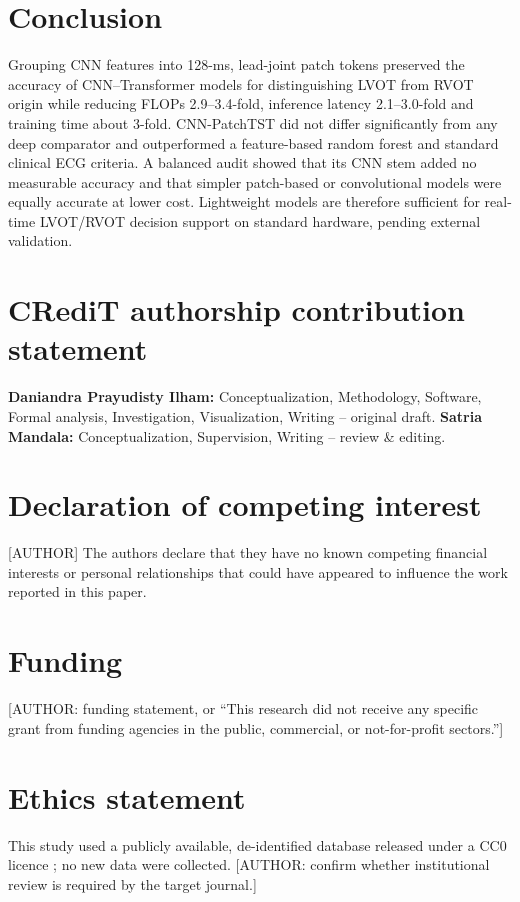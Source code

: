 \documentclass[preprint,12pt]{elsarticle}
\begin{document}
\section{Conclusion}
\label{sec:conclusion}
Grouping CNN features into 128-ms, lead-joint patch tokens preserved the accuracy of CNN--Transformer models for distinguishing LVOT from RVOT origin while reducing FLOPs 2.9--3.4-fold, inference latency 2.1--3.0-fold and training time about 3-fold. CNN-PatchTST did not differ significantly from any deep comparator and outperformed a feature-based random forest and standard clinical ECG criteria. A balanced audit showed that its CNN stem added no measurable accuracy and that simpler patch-based or convolutional models were equally accurate at lower cost. Lightweight models are therefore sufficient for real-time LVOT/RVOT decision support on standard hardware, pending external validation.

\section*{CRediT authorship contribution statement}
\textbf{Daniandra Prayudisty Ilham:} Conceptualization, Methodology, Software, Formal analysis, Investigation, Visualization, Writing -- original draft. \textbf{Satria Mandala:} Conceptualization, Supervision, Writing -- review \& editing.

\section*{Declaration of competing interest}
[AUTHOR] The authors declare that they have no known competing financial interests or personal relationships that could have appeared to influence the work reported in this paper.

\section*{Funding}
[AUTHOR: funding statement, or ``This research did not receive any specific grant from funding agencies in the public, commercial, or not-for-profit sectors.'']

\section*{Ethics statement}
This study used a publicly available, de-identified database released under a CC0 licence \cite{zheng2020dataset}; no new data were collected. [AUTHOR: confirm whether institutional review is required by the target journal.]
\end{document}
